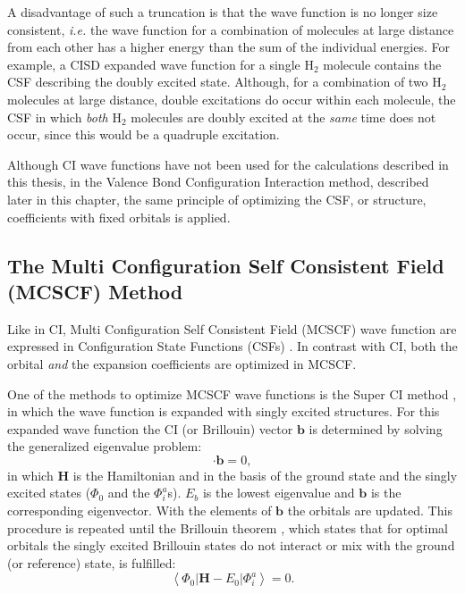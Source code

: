 A disadvantage of such a truncation is that the wave function is no longer size consistent, \textit{i.e.} the wave function for a combination of molecules at large distance from each other has a higher energy than the sum of the individual energies. For example, a CISD expanded wave function for a single H$_2$ molecule contains the CSF describing the doubly excited state. Although, for a combination of two H$_2$ molecules at large distance, double excitations do occur within each molecule, the CSF in which \textit{both} H$_2$ molecules are doubly excited at the \textit{same} time does not occur, since this would be a quadruple excitation.

Although CI wave functions have not been used for the calculations described in this thesis, in the Valence Bond Configuration Interaction method, described later in this chapter, the same principle of optimizing the CSF, or structure, coefficients with fixed orbitals is applied.

\subsection{\label{ch1.sec.mcscf}The Multi Configuration Self Consistent Field (MCSCF) Method}
Like in CI, Multi Configuration Self Consistent Field (MCSCF) wave function are expressed in Configuration State Functions (CSFs) \cite{wahldasbook,daswahl}. In contrast with CI, both the orbital \textit{and} the expansion coefficients are optimized in MCSCF.

One of the methods to optimize MCSCF wave functions is the Super CI method \cite{superci1,superci2}, in which the wave function is expanded with singly excited structures. For this expanded wave function the CI (or Brillouin) vector $\mathbf{b}$ is determined by solving the generalized eigenvalue problem:
\begin{equation}
[\mathbf{H}-E_b] \cdot \mathbf{b} = 0,
\label{ch1.eq.geig}
\end{equation}
in which $\mathbf{H}$ is the Hamiltonian and in the basis of the ground state and the singly excited states ($\Phi_0$ and the $\Phi_{i}^{a}$s). $E_b$ is the lowest eigenvalue and $\mathbf{b}$ is the corresponding eigenvector. With the elements of $\mathbf{b}$ the orbitals are updated. This procedure is repeated until the Brillouin theorem \cite{brillouin}, which states that for optimal orbitals the singly excited Brillouin states do not interact or mix with the ground (or reference) state, is fulfilled:
\begin{equation}
\left < \Phi_0 | \mathbf{H} - E_0 | \Phi_{i}^{a} \right > = 0.
\label{ch1.eq.brillouin}
\end{equation}

